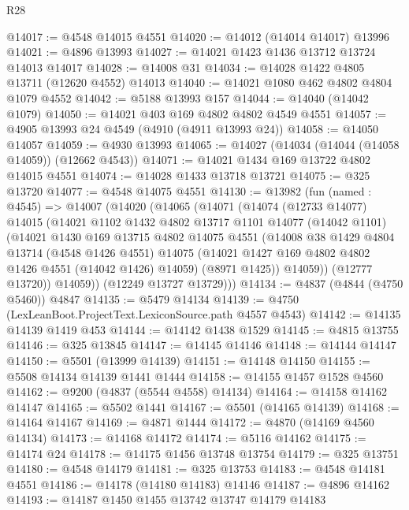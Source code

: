 \begin{lexlean}{R28}
\begin{coremodule}
@14017 := @4548 @14015 @4551
@14020 := @14012 (@14014 @14017) @13996
@14021 := @4896 @13993
@14027 := @14021 @1423 @1436 @13712 @13724 @14013 @14017
@14028 := @14008 @31
@14034 := @14028 @1422 @4805 @13711 (@12620 @4552) @14013
@14040 := @14021 @1080 @462 @4802 @4804 @1079 @4552
@14042 := @5188 @13993 @157
@14044 := @14040 (@14042 @1079)
@14050 := @14021 @403 @169 @4802 @4802 @4549 @4551
@14057 := @4905 @13993 @24 @4549 (@4910 (@4911 @13993 @24))
@14058 := @14050 @14057
@14059 := @4930 @13993
@14065 := @14027 (@14034 (@14044 (@14058 @14059)) (@12662 @4543))
@14071 := @14021 @1434 @169 @13722 @4802 @14015 @4551
@14074 := @14028 @1433 @13718 @13721
@14075 := @325 @13720
@14077 := @4548 @14075 @4551
@14130 := @13982
    (fun (named : @4545) =>
    @14007
      (@14020
        (@14065
          (@14071
            (@14074
              (@12733 @14077)
              @14015
              (@14021
                @1102
                @1432
                @4802
                @13717
                @1101
                @14077
                (@14042 @1101)
                (@14021
                  @1430
                  @169
                  @13715
                  @4802
                  @14075
                  @4551
                  (@14008
                    @38
                    @1429
                    @4804
                    @13714
                    (@4548 @1426 @4551)
                    @14075
                    (@14021 @1427 @169 @4802 @4802 @1426 @4551 (@14042 @1426) @14059)
                    (@8971 @1425))
                  @14059))
              (@12777 @13720))
            @14059))
        (@12249 @13727 @13729)))
@14134 := @4837 (@4844 (@4750 @5460)) @4847
@14135 := @5479 @14134
@14139 := @4750 (LexLeanBoot.ProjectText.LexiconSource.path @4557 @4543)
@14142 := @14135 @14139 @1419 @453
@14144 := @14142 @1438 @1529
@14145 := @4815 @13755
@14146 := @325 @13845
@14147 := @14145 @14146
@14148 := @14144 @14147
@14150 := @5501 (@13999 @14139)
@14151 := @14148 @14150
@14155 := @5508 @14134 @14139 @1441 @1444
@14158 := @14155 @1457 @1528 @4560
@14162 := @9200 (@4837 (@5544 @4558) @14134)
@14164 := @14158 @14162 @14147
@14165 := @5502 @1441
@14167 := @5501 (@14165 @14139)
@14168 := @14164 @14167
@14169 := @4871 @1444
@14172 := @4870 (@14169 @4560 @14134)
@14173 := @14168 @14172
@14174 := @5116 @14162
@14175 := @14174 @24
@14178 := @14175 @1456 @13748 @13754
@14179 := @325 @13751
@14180 := @4548 @14179
@14181 := @325 @13753
@14183 := @4548 @14181 @4551
@14186 := @14178 (@14180 @14183) @14146
@14187 := @4896 @14162
@14193 := @14187 @1450 @1455 @13742 @13747 @14179 @14183

\end{coremodule}
\end{lexlean}
